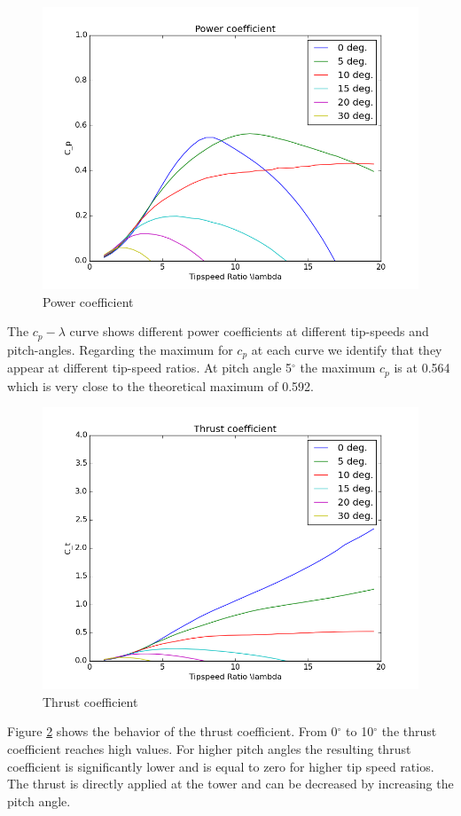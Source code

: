 \documentclass[10pt]{article}
\begin{document}
\begin{figure}[H]
\centering
\includegraphics[width=1\linewidth]{../CIP_3/WT_Perf/Output/cp.png}
\caption{Power coefficient}
\label{fig:c-lambda}
\end{figure} 
The $c_p-\lambda$ curve shows different power coefficients at different tip-speeds and pitch-angles. Regarding the maximum for $c_p$ at each curve we identify that they appear at different tip-speed ratios. At pitch angle 5$^\circ$ the maximum $c_p$ is at 0.564 which is very close to the theoretical maximum of 0.592.

\begin{figure}[H]
\centering
\includegraphics[width=1\linewidth]{../CIP_3/WT_Perf/Output/thrust.png}
\caption{Thrust coefficient}
\label{fig:thrust-coeff}
\end{figure} 
Figure \ref{fig:thrust-coeff} shows the behavior of the thrust coefficient. 
From 0$^\circ$ to 10$^\circ$ the thrust coefficient reaches high values. For higher pitch angles the resulting thrust coefficient is significantly lower and is equal to zero for higher tip speed ratios. The thrust is directly applied at the tower and can be decreased by increasing the pitch angle.
\end{document}
